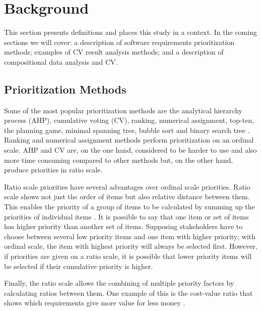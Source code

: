\section{Background\label{background}}

This section presents definitions and places this study in a context. In the coming sections we will cover: a description of software requirements prioritization methods; examples of CV result analysis methods; and a description of compositional data analysis and CV.

\subsection{Prioritization Methods}

Some of the most popular prioritization methods are the analytical hierarchy
process (AHP), cumulative voting (CV), ranking, numerical assignment,
top-ten, the planning game, minimal spanning tree, bubble sort and binary
search tree \cite{Berander2005,Karlsson1998}. Ranking and numerical
assignment methods perform prioritization on an ordinal scale. AHP and CV
are, on the one hand, considered to be harder to use and also more time 
consuming compared to other methods but, on the other hand, produce 
priorities in ratio scale.

%
Ratio scale priorities have several advantages over ordinal scale
priorities. Ratio scale shows not just the order of items but also
relative distance between them. This enables the priority of a group of
items to be calculated by summing up the priorities of individual items
\cite{Berander2006a}. It is possible to say that one item or set
of items has higher priority than another set of items. Supposing stakeholders
have to choose between several low priority items and one item with
higher priority; with ordinal scale, the item with highest priority will
always be selected first. However, if priorities are given on a ratio
scale, it is possible that lower priority items will be selected if
their cumulative priority is higher. 

Finally, the ratio scale allows the combining of multiple priority factors by calculating ratios
between them. One example of this is the cost-value ratio that shows which
requirements give more value for less money \cite{Karlsson1997}.

